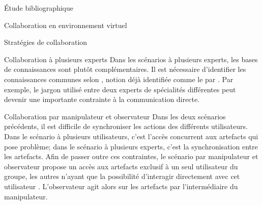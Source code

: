 \documentclass[myfrancais,ngerman,english,frenchb]{mythesis}
\begin{document}
\begin{mychapter}{Étude bibliographique}
\begin{mysection}{Collaboration en environnement virtuel}
\begin{mysubsection}{Stratégies de collaboration}
\begin{mysubsubsection}{Collaboration à plusieurs experts}
					Dans les scénarios à plusieurs experts, les bases de connaissances sont plutôt complémentaires.
					Il est nécessaire d'identifier les connaissances communes selon , notion déjà identifiée comme le \mygrounding par  .
					Par exemple, le jargon utilisé entre deux experts de spécialités différentes peut devenir une importante contrainte à la communication directe.
				\end{mysubsubsection}
				\begin{mysubsubsection}{Collaboration par manipulateur et observateur}
					Dans les deux scénarios précédents, il est difficile de synchroniser les actions des différents utilisateurs.
					Dans le scénario à plusieurs utilisateurs, c'est l'accès concurrent aux artefacts qui pose problème; dans le scénario à plusieurs experts, c'est la synchronisation entre les artefacts.
					Afin de passer outre ces contraintes, le scénario par manipulateur et observateur propose un accès aux artefacts exclusif à un seul utilisateur du groupe, les autres n'ayant que la possibilité d'interagir directement avec cet utilisateur .
					L'observateur agit alors sur les artefacts par l'intermédiaire du manipulateur.


\end{mysubsubsection}
\end{mysubsection}
\end{mysection}
\end{mychapter}
\end{document}

